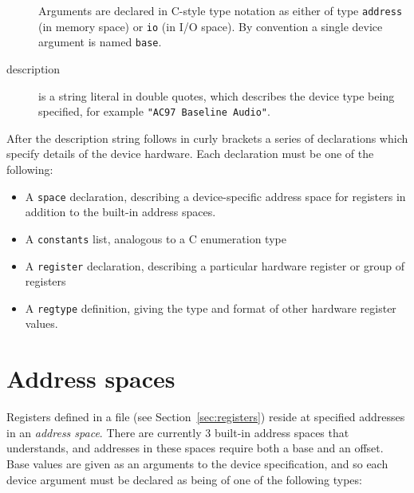 \documentclass[a4paper,11pt,twoside]{report}
\begin{document}
\begin{description}
  Arguments are declared in C-style type notation as either of type
  \texttt{address} (in memory space) or \texttt{io} (in I/O
  space).  By convention a single device argument is named
  \texttt{base}. 

\item [description] is a string literal in double quotes, which
  describes the device type being specified, for example \texttt{"AC97
  Baseline Audio"}. 

\end{description}

After the description string follows in curly brackets a series of
declarations which specify details of the device hardware.   Each
declaration must be one of the following:

\begin{itemize}

  \item A \texttt{space} declaration, describing a device-specific
    address space for registers in addition to the built-in address
    spaces. 
  
  \item A \texttt{constants} list, analogous to a C enumeration type

  \item A \texttt{register} declaration, describing a particular
    hardware register or group of registers
    
  \item A \texttt{regtype} definition, giving the type and format of
    other hardware register values. 

\end{itemize}

\section{Address spaces}\label{sec:spaces}

Registers defined in a \Mac file (see Section~\ref{sec:registers})
reside at specified addresses in an \emph{address space}.   There are
currently 3 built-in address spaces that \Mac understands, and
addresses in these spaces require both a base and an offset.  Base
values are given as an arguments to the device specification, and so
each device argument must be declared as being of one of the following
types: 
\end{document}

